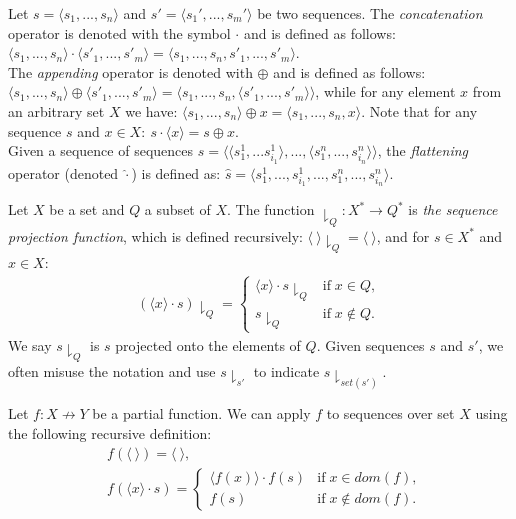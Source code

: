 \begin{definition}
Let $s=\langle s_1,...,s_n \rangle$ and $s'=\langle s_1',...,s_m' \rangle$ be two sequences.
The \emph{concatenation} operator is denoted with the symbol $\cdot$ and is defined as follows: 
$\langle s_1,...,s_n \rangle \cdot \langle s'_1,...,s'_m \rangle = \langle s_1,...,s_n,s'_1,...,s'_m \rangle$. \\
The \emph{appending} operator is denoted with $\oplus$ and is defined as follows: $\langle s_1,...,s_n \rangle \oplus \langle s'_1,...,s'_m \rangle \allowbreak = \langle s_1,...,s_n, \langle s'_1,...,s'_m \rangle \rangle$, while for any element $x$ from an arbitrary set $X$ we have:
$\langle s_1,...,s_n \rangle \oplus x = \langle s_1,...,s_n,x \rangle$.
Note that for any sequence $s$ and $x \in X: ~ s \cdot \langle x \rangle = s \oplus x$.\\
Given a sequence of sequences $s = \langle \langle s^1_1,...s^1_{i_1} \rangle,..., \langle s^n_1,...,s^n_{i_n}\rangle \rangle$, the \emph{flattening} operator (denoted  $\widehat{\cdot}$) is defined as: $\widehat{s} = \langle s^1_1,...,s^1_{i_1},...,s^n_1,...,s^n_{i_n}\rangle$.
\end{definition}

\pagebreak
\begin{definition}
Let $X$ be a set and $Q$ a subset of $X$. The function $ \downharpoonright_Q: X^* \to Q^*$ is \emph{the sequence projection function}, which is defined recursively:
$\langle ~ \rangle \downharpoonright_Q = \langle ~ \rangle$, and for $s \in X^*$ and $x \in X$:
\begin{align*}
(\langle x \rangle \cdot s) \downharpoonright_Q = \begin{cases}
	 \langle x \rangle \cdot s \downharpoonright_Q & \mbox{if} \; x \in Q, \\
	s\downharpoonright_Q & \mbox{if} \; x \not \in Q.
	\end{cases} 
\end{align*}
We say $s \downharpoonright_Q$ is $s$ projected onto the elements of $Q$.
Given sequences $s$ and $s'$, we often misuse the notation and use $s \downharpoonright_{s'}$ to indicate $s \downharpoonright_{set(s')}$.
\end{definition}


\begin{definition}
Let $f: X \not \to Y$ be a partial function.
We can apply $f$ to sequences over set $X$ using the following recursive definition:
\begin{align*}
&f(\langle ~ \rangle) = \langle ~ \rangle, \\
&f(\langle x \rangle \cdot s)  = \begin{cases}
	 \langle f(x) \rangle \cdot f(s) & \mbox{if} \; x \in dom(f), \\
	f(s) & \mbox{if} \; x \not \in dom(f).
	\end{cases} 
\end{align*}

\end{definition}


